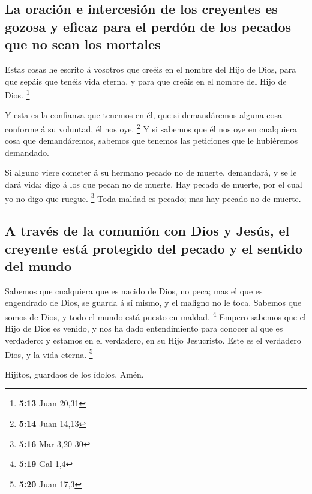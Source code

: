 \hypertarget{la-oraciuxf3n-e-intercesiuxf3n-de-los-creyentes-es-gozosa-y-eficaz-para-el-perduxf3n-de-los-pecados-que-no-sean-los-mortales}{%
\subsection{La oración e intercesión de los creyentes es gozosa y eficaz
para el perdón de los pecados que no sean los
mortales}\label{la-oraciuxf3n-e-intercesiuxf3n-de-los-creyentes-es-gozosa-y-eficaz-para-el-perduxf3n-de-los-pecados-que-no-sean-los-mortales}}

 Estas cosas he escrito á vosotros que creéis en el nombre
del Hijo de Dios, para que sepáis que tenéis vida eterna, y para que
creáis en el nombre del Hijo de Dios. \footnote{\textbf{5:13} Juan 20,31}

 Y esta es la confianza que tenemos en él, que si
demandáremos alguna cosa conforme á su voluntad, él nos oye. \footnote{\textbf{5:14}
  Juan 14,13}  Y si sabemos que él nos oye en cualquiera
cosa que demandáremos, sabemos que tenemos las peticiones que le
hubiéremos demandado.

 Si alguno viere cometer á su hermano pecado no de muerte,
demandará, y se le dará vida; digo á los que pecan no de muerte. Hay
pecado de muerte, por el cual yo no digo que ruegue. \footnote{\textbf{5:16}
  Mar 3,20-30}  Toda maldad es pecado; mas hay pecado no de
muerte.

\hypertarget{a-travuxe9s-de-la-comuniuxf3n-con-dios-y-jesuxfas-el-creyente-estuxe1-protegido-del-pecado-y-el-sentido-del-mundo}{%
\subsection{A través de la comunión con Dios y Jesús, el creyente está
protegido del pecado y el sentido del
mundo}\label{a-travuxe9s-de-la-comuniuxf3n-con-dios-y-jesuxfas-el-creyente-estuxe1-protegido-del-pecado-y-el-sentido-del-mundo}}

 Sabemos que cualquiera que es nacido de Dios, no peca; mas
el que es engendrado de Dios, se guarda á sí mismo, y el maligno no le
toca.  Sabemos que somos de Dios, y todo el mundo está
puesto en maldad. \footnote{\textbf{5:19} Gal 1,4}  Empero
sabemos que el Hijo de Dios es venido, y nos ha dado entendimiento para
conocer al que es verdadero: y estamos en el verdadero, en su Hijo
Jesucristo. Este es el verdadero Dios, y la vida eterna. \footnote{\textbf{5:20}
  Juan 17,3}

 Hijitos, guardaos de los ídolos. Amén.

